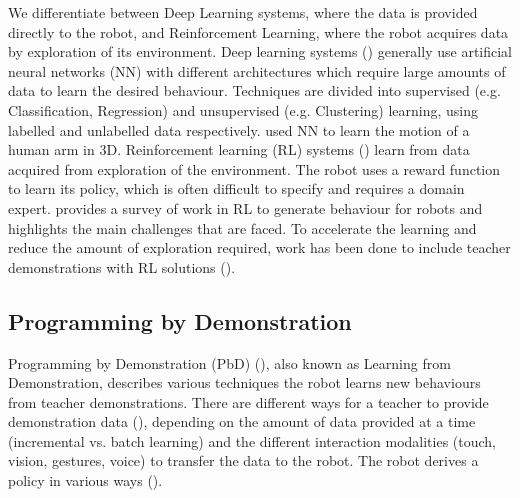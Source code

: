We differentiate between Deep Learning systems, where the data is provided directly to the robot, and Reinforcement Learning, where the robot acquires data by exploration of its environment.
Deep learning systems (\cite{schmidhuber2015deep}) generally use artificial neural networks (NN) with different architectures which require large amounts of data to learn the desired behaviour.
Techniques are divided into supervised (e.g. Classification, Regression) and unsupervised (e.g. Clustering) learning, using labelled and unlabelled data respectively.
\cite{billard2001robust} used NN to learn the motion of a human arm in 3D.
Reinforcement learning (RL) systems (\cite{sutton1998reinforcement,kaelbling1996reinforcement,gosavi2009reinforcement}) learn from data acquired from exploration of the environment. 
The robot uses a reward function to learn its policy, which is often difficult to specify and requires a domain expert.
\cite{kober2013reinforcement} provides a survey of work in RL to generate behaviour for robots and highlights the main challenges that are faced.
To accelerate the learning and reduce the amount of exploration required, work has been done to include teacher demonstrations with RL solutions (\cite{martinez2017relational,hester2017learning}).


\subsection{Programming by Demonstration}
Programming by Demonstration (PbD) (\cite{billard2008robot}), also known as Learning from Demonstration, describes various techniques the robot learns new behaviours from teacher demonstrations. 
There are different ways for a teacher to provide demonstration data (), depending on the amount of data provided at a time (incremental vs. batch learning) and the different interaction modalities (touch, vision, gestures, voice) to transfer the data to the robot. 
The robot derives a policy in various ways (). 

